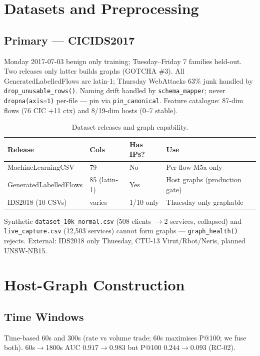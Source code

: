 \documentclass[12pt,a4paper,oneside]{report}
\newcommand{\bluetableheader}{\rowcolor{headerblue}\color{white}\bfseries}
\begin{document}
\section{Datasets and Preprocessing}
\subsection{Primary — CICIDS2017}
Monday 2017-07-03 benign only training; Tuesday--Friday 7 families held-out. Two releases only latter builds graphs (GOTCHA \#3). All GeneratedLabelledFlows are latin-1; Thursday WebAttacks 63\% junk handled by \texttt{drop\_unusable\_rows()}. Naming drift handled by \texttt{schema\_mapper}; never \texttt{dropna(axis=1)} per-file — pin via \texttt{pin\_canonical}. Feature catalogue: 87-dim flows (76 CIC +11 ctx) and 8/19-dim hosts (0--7 stable).

\begin{table}[H]
\centering
\caption{Dataset releases and graph capability.}
\label{tab:3.1}
\begin{tabular}{|L{4.5cm}|C{1.5cm}|C{1.8cm}|L{6.5cm}|}
\hline
\bluetableheader Release & Cols & Has IPs? & Use \\ \hline
{} MachineLearningCSV & 79 & No & Per-flow M5a only \\ \hline
GeneratedLabelledFlows & 85 (latin-1) & Yes & Host graphs (production gate) \\ \hline
{} IDS2018 (10 CSVs) & varies & 1/10 only & Thuesday only graphable \\ \hline
\end{tabular}
\end{table}

Synthetic \texttt{dataset\_10k\_normal.csv} (508 clients $\rightarrow$2 services, collapsed) and \texttt{live\_capture.csv} (12,503 services) cannot form graphs — \texttt{graph\_health()} rejects. External: IDS2018 only Thuesday, CTU-13 Virut/Rbot/Neris, planned UNSW-NB15.

\section{Host-Graph Construction}
\subsection{Time Windows}
Time-based 60s and 300s (rate vs volume trade; 60s maximises P@100; we fuse both). 60s$\rightarrow$1800s AUC $0.917\rightarrow0.983$ but P@100 $0.244\rightarrow0.093$ (RC-02).
\end{document}
